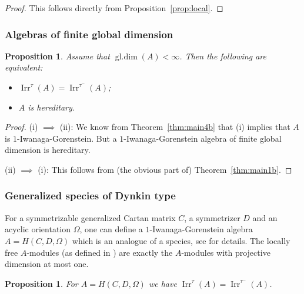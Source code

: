 \documentclass[12pt,reqno]{amsart}
\newtheorem{Prop}[Thm]{Proposition}
\theoremstyle{definition}
\newcommand{\gldim}{\operatorname{gl.dim}}
\newcommand{\irr}{\operatorname{Irr}}
\begin{document}
\begin{proof}
This follows directly from Proposition~\ref{prop:local}.
\end{proof}

\subsubsection{Algebras of finite global dimension}


\begin{Prop}\label{prop:finiteglobaldim}
Assume that $\gldim(A) < \infty$.
Then the following are equivalent:
\begin{itemize}\itemsep2mm

\item[(i)]
$\irr^\tau(A) = \irr^{\tau^-}(A)$;

\item[(ii)]
$A$ is hereditary.

\end{itemize}
\end{Prop}

\begin{proof}
(i) $\implies$ (ii):
We know from Theorem~\ref{thm:main4b} that (i) implies that
$A$ is $1$-Iwanaga-Gorenstein.
But a $1$-Iwanaga-Gorenstein algebra of finite global dimension
is hereditary.

(ii) $\implies$ (i):
This follows from (the obvious part of) Theorem~\ref{thm:main1b}.
\end{proof}


\subsubsection{Generalized species of Dynkin type}

For a symmetrizable generalized Cartan matrix $C$,
a symmetrizer $D$ and an acyclic orientation $\Omega$,
one can define a $1$-Iwanaga-Gorenstein algebra
$A = H(C,D,\Omega)$ which is an analogue of a species, see
\cite{GLS17} for details.
The locally free $A$-modules (as defined in \cite{GLS17}) are exactly
the $A$-modules with projective dimension at most one.



\begin{Prop}
For $A = H(C,D,\Omega)$ we have
$\irr^\tau(A) = \irr^{\tau^-}(A)$.
\end{Prop}
\end{document}
